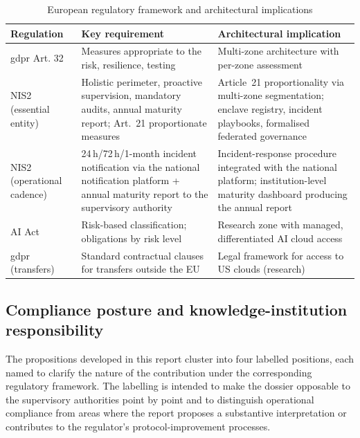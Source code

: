 \begin{table}[H]
\centering
\caption{European regulatory framework and architectural implications}
\label{tab:reglementation}
\small
\begin{tabularx}{\textwidth}{l X X}
\toprule
\textbf{Regulation} & \textbf{Key requirement} &
    \textbf{Architectural implication} \\
\midrule
\gls{gdpr} Art. 32 & Measures appropriate to the risk, resilience, testing &
    Multi-zone architecture with per-zone assessment \\
\addlinespace
NIS2 (essential entity) & Holistic perimeter, proactive supervision,
    mandatory audits, annual maturity report; Art.~21 proportionate measures &
    Article~21 proportionality via multi-zone segmentation; enclave
    registry, incident playbooks, formalised federated governance \\
\addlinespace
NIS2 (operational cadence) & 24\,h/72\,h/1-month incident notification
    via the national notification platform + annual maturity report to
    the supervisory authority & Incident-response procedure integrated
    with the national platform; institution-level maturity dashboard
    producing the annual report \\
\addlinespace
AI Act & Risk-based classification; obligations by risk level &
    Research zone with managed, differentiated AI cloud access \\
\addlinespace
\gls{gdpr} (transfers) & Standard contractual clauses for transfers outside the EU &
    Legal framework for access to US clouds (research) \\
\bottomrule
\end{tabularx}
\end{table}

\subsection{Compliance posture and knowledge-institution responsibility}
\label{sec:advocacy}

The propositions developed in this report cluster into four
labelled positions, each named to clarify the nature of the
contribution under the corresponding regulatory framework. The
labelling is intended to make the dossier opposable to the
supervisory authorities point by point and to distinguish
operational compliance from areas where the report proposes a
substantive interpretation or contributes to the regulator's
protocol-improvement processes.

